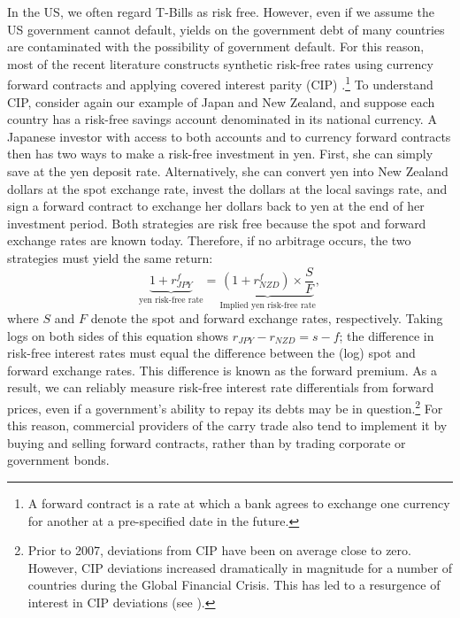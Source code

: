 \documentclass[11pt]{article}
\begin{document}
\begin{tcolorbox}[sharp corners, title = Measuring Risk-free Interest Rates and Currency Returns]
    In the US, we often regard T-Bills as risk free. However, even if we assume the US government cannot default, yields on the government debt of many countries are contaminated with the possibility of government default. For this reason, most of the recent literature constructs synthetic risk-free rates using currency forward contracts and applying covered interest parity (CIP) \citep{LustigRoussanovVerdelhan2011, DuSchreger2016}.\footnote{A forward contract is a rate at which a bank agrees to exchange one currency for another at a pre-specified date in the future.} To understand CIP, consider again our example of Japan and New Zealand, and suppose each country has a risk-free savings account denominated in its national currency. A Japanese investor with access to both accounts and to currency forward contracts then has two ways to make a risk-free investment in yen. First, she can simply save at the yen deposit rate. Alternatively, she can convert yen into New Zealand dollars at the spot exchange rate, invest the dollars at the local savings rate, and sign a forward contract to exchange her dollars back to yen at the end of her investment period. Both strategies are risk free because the spot and forward exchange rates are known today. Therefore, if no arbitrage occurs, the two strategies must yield the same return:
    \begin{equation}
    \underbrace{1 + r^f_{JPY}}_{\text{yen risk-free rate}}
    = \underbrace{
        (1 + r^f_{NZD}) \times \frac{S}{F}
    }_{\text{Implied yen risk-free rate}},
    \label{eqn:CIP}
    \end{equation}
    where $S$ and $F$ denote the spot and forward exchange rates, respectively. Taking logs on both sides of this equation shows $r_{JPY}-r_{NZD} = s - f$; the difference in risk-free interest rates must equal the difference between the (log) spot and forward exchange rates. This difference is known as the forward premium. As a result, we can reliably measure risk-free interest rate differentials from forward prices, even if a government's ability to repay its debts may be in question.\footnote{Prior to 2007, deviations from CIP have been on average close to zero. However, CIP deviations increased dramatically in magnitude for a number of countries during the Global Financial Crisis. This has led to a resurgence of interest in CIP deviations (see \citet{DuTepperVerdelhan2018}).} For this reason, commercial providers of the carry trade also tend to implement it by buying and selling forward contracts, rather than by trading corporate or government bonds.
\end{tcolorbox}
\end{document}

